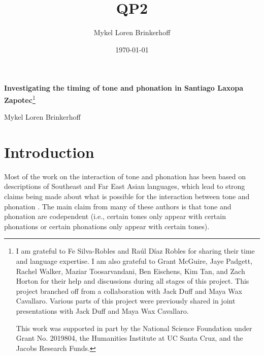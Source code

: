 \documentclass[12pt, letterpaper]{article}
\title{QP2}
\author{Mykel Loren Brinkerhoff}
\date{\today}
\begin{document}
	
	
	\onehalfspacing
	
\begin{center}
	{\Large \textbf{Investigating the timing of tone and phonation in Santiago Laxopa Zapotec}}\footnote{I am grateful to Fe Silva-Robles and  Raúl Díaz Robles for sharing their time and language expertise. I am also grateful to Grant McGuire,  Jaye Padgett, Rachel Walker, Maziar Toosarvandani, Ben Eischens, Kim Tan, and Zach Horton for their help and discussions during all stages of this project. This project branched off from a collaboration with  Jack Duff and Maya Wax Cavallaro. Various parts of this project were previously shared in joint presentations with Jack Duff and Maya Wax Cavallaro.
	
	This work was supported in part by the National Science Foundation under Grant No. 2019804, the Humanities Institute at UC Santa Cruz, and the Jacobs Research Funds.}
	\vspace{6pt}

	Mykel Loren Brinkerhoff
\end{center}
\thispagestyle{fancy}



\section{Introduction} \label{sec:Introduction}

Most of the work on the interaction of tone and phonation has been based on descriptions of Southeast and Far East Asian languages, which lead to strong claims being made about what is possible for the interaction between tone and phonation \citep{masicaDefiningLinguisticArea1976,thurgoodVietnameseTonogenesisRevising2002,yipTone2002,enfieldArealLinguisticsMainland2005,michaudComplexTonesEast2012,brunelleTonePhonationSoutheast2016}. The main claim from many of these authors is that tone and phonation are codependent (i.e., certain tones only appear with certain phonations or certain phonations only appear with certain tones).
\end{document}
